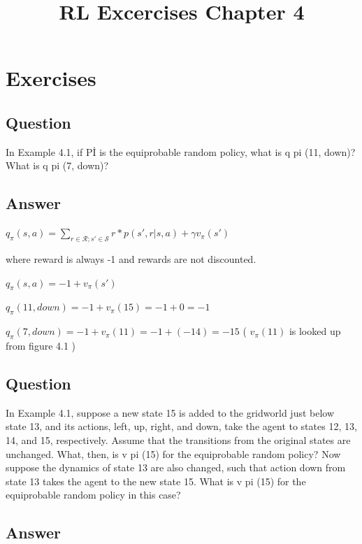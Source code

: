 \documentclass[11pt]{article}
\title{RL Excercises Chapter 4}
\begin{document}
    \maketitle
    \setcounter{section}{3}


    \section{Exercises}

    \subsection{Question}
    In Example 4.1, if Pİ is the equiprobable random policy, what is q pi (11, down)?
    What is q pi (7, down)?

    \subsection*{Answer}

    $ q_\pi(s,a) = \sum_{r \in \mathcal{R}; s' \in \mathcal{S}} r*p(s',r|s,a) + \gamma v_\pi (s') $

    where reward is always -1 and rewards are not discounted.

    $ q_\pi(s,a) = -1 + v_\pi (s') $

    $ q_\pi(11,down) = -1 + v_\pi (15) = -1 + 0 = -1  $

    $ q_\pi(7,down) = -1 + v_\pi (11) = -1 + (-14) = -15 $ ( $v_\pi (11)$  is looked up from figure 4.1 )

    \subsection{Question}

    In Example 4.1, suppose a new state 15 is added to the gridworld just below state 13, and its actions, left, up, right, and down, take the agent to states 12, 13, 14, and 15, respectively.
    Assume that the transitions from the original states are unchanged.
    What, then, is v pi (15) for the equiprobable random policy?
    Now suppose the dynamics of state 13 are also changed, such that action down from state 13 takes the agent to the new state 15.
    What is v pi (15) for the equiprobable random policy in this case?

    \subsection*{Answer}
\end{document}

